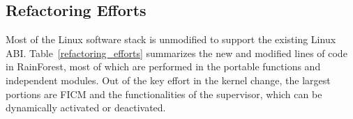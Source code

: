 \documentclass[pageno]{jpaper}
\begin{document}
 \subsection{Refactoring Efforts}\label{refactoring}


Most of the Linux software stack is unmodified to support the existing Linux ABI. Table~\ref{refactoring_efforts} summarizes  the new and modified lines of code in RainForest, most of which are performed in the portable functions and independent modules. Out of the key effort in the kernel change, the largest portions are FICM and the functionalities of the supervisor, which can be dynamically activated or deactivated.
\end{document}
